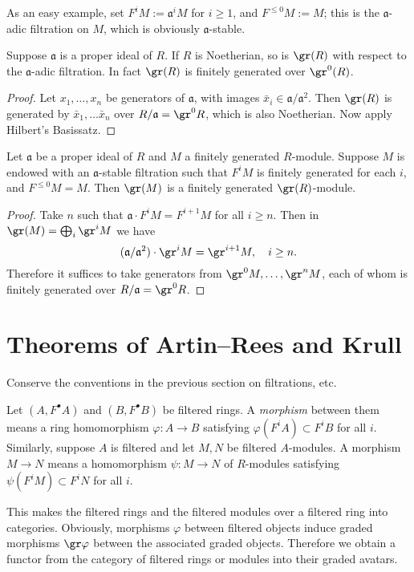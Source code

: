 As an easy example, set $F^i M := \mathfrak{a}^i M$ for $i \geq 1$, and $F^{\leq 0} M := M$; this is the $\mathfrak{a}$-adic filtration on $M$, which is obviously $\mathfrak{a}$-stable.

\begin{proposition}\label{prop:gr-Noetherian}
	Suppose $\mathfrak{a}$ is a proper ideal of $R$. If $R$ is Noetherian, so is $\gr(R)$ with respect to the $\mathfrak{a}$-adic filtration. In fact $\gr(R)$ is finitely generated over $\gr^0(R)$.
\end{proposition}
\begin{proof}
	Let $x_1, \ldots, x_n$ be generators of $\mathfrak{a}$, with images $\bar{x}_i \in \mathfrak{a}/\mathfrak{a}^2$. Then $\gr(R)$ is generated by $\bar{x}_1, \ldots \bar{x}_n$ over $R/\mathfrak{a} = \gr^0 R$, which is also Noetherian. Now apply Hilbert's Basissatz.
\end{proof}

\begin{proposition}\label{prop:gr-fg}
	Let $\mathfrak{a}$ be a proper ideal of $R$ and $M$ a finitely generated $R$-module. Suppose $M$ is endowed with an $\mathfrak{a}$-stable filtration such that $F^i M$ is finitely generated for each $i$, and $F^{\leq 0} M = M$. Then $\gr(M)$ is a finitely generated $\gr(R)$-module.
\end{proposition}
\begin{proof}
	Take $n$ such that $\mathfrak{a} \cdot F^i M = F^{i+1} M$ for all $i \geq n$. Then in $\gr(M) = \bigoplus_i \gr^i M$ we have
	\[ (\mathfrak{a}/\mathfrak{a}^2) \cdot \gr^i M = \gr^{i+1} M, \quad i \geq n. \]
	Therefore it suffices to take generators from $\gr^0 M, \ldots, \gr^n M$, each of whom is finitely generated over $R/\mathfrak{a} = \gr^0 R$.
\end{proof}

\section{Theorems of Artin--Rees and Krull}\label{sec:Artin-Rees}
Conserve the conventions in the previous section on filtrations, etc.

\begin{definition}
	Let $(A, F^\bullet A)$ and $(B, F^\bullet B)$ be filtered rings. A \emph{morphism} between them means a ring homomorphism $\varphi: A \to B$ satisfying $\varphi(F^i A) \subset F^i B$ for all $i$. Similarly, suppose $A$ is filtered and let $M, N$ be filtered $A$-modules. A morphism $M \to N$ means a homomorphism $\psi: M \to N$ of $R$-modules satisfying $\psi(F^i M) \subset F^i N$ for all $i$.
\end{definition}
This makes the filtered rings and the filtered modules over a filtered ring into categories. Obviously, morphisms $\varphi$ between filtered objects induce graded morphisms $\gr \varphi$ between the associated graded objects. Therefore we obtain a functor from the category of filtered rings or modules into their graded avatars.

